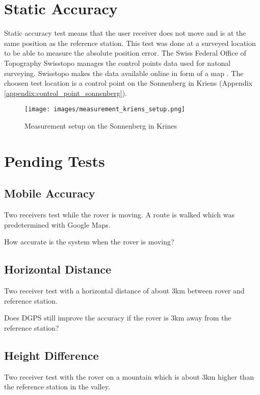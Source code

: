 \section{Static Accuracy}\label{sec:static_accuracy}

Static accuracy test means that the user receiver does not move and is at the same position as the reference station.
This test was done at a surveyed location to be able to measure the absolute position error.
The Swiss Federal Office of Topography Swisstopo manages the control points data used for natonal surveying.
Swisstopo makes the data available online in form of a map \cite{Swisstopo}.
The choosen test location is a control point on the Sonnenberg in Kriens (Appendix \ref{appendix:control_point_sonnenberg}).


\begin{figure}[ht]
 \centering
 \texttt{[image: images/measurement\_kriens\_setup.png]}
 \caption{Measurement setup on the Sonnenberg in Krines}
 \label{fig:measurement_kriens_setup}
\end{figure}


\section{Pending Tests}

\subsection{Mobile Accuracy}
Two receivers test while the rover is moving.
A route is walked which was predetermined with Google Maps.

How accurate is the system when the rover is moving?

\subsection{Horizontal Distance}
Two receiver test with a horizontal distance of about 3km between rover and reference station.

Does DGPS still improve the accuracy if the rover is 3km away from the reference station?

\subsection{Height Difference}

Two receiver test with the rover on a mountain which is about 3km higher than the reference station in the valley.


